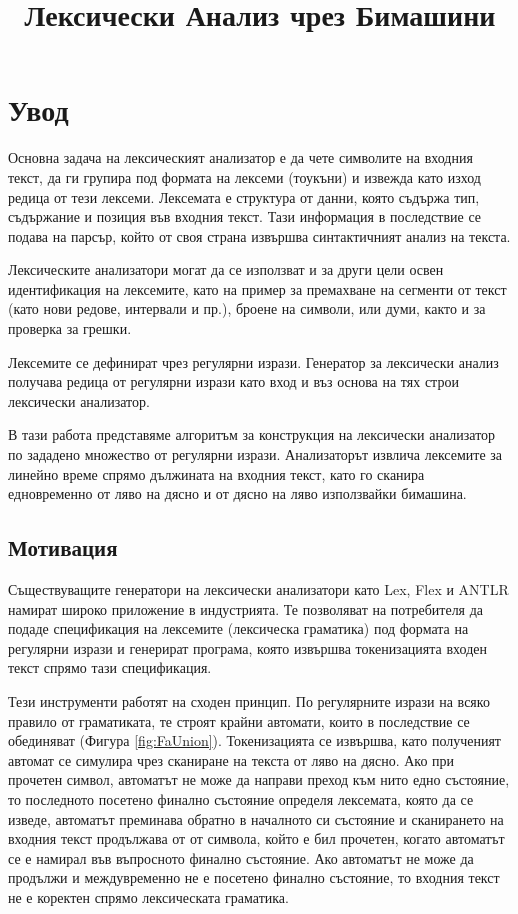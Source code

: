 \documentclass[12pt, oneside]{article}
\title{Лексически Анализ чрез Бимашини}
\theoremstyle{definition}
\begin{document}
\tableofcontents

\pagebreak
\section{Увод}

Основна задача на лексическият анализатор е да чете символите на входния текст, да ги групира под формата на лексеми (тоукъни) и извежда като изход редица от тези лексеми. Лексемата е структура от данни, която съдържа тип, съдържание и позиция във входния текст. Тази информация в последствие се подава на парсър, който от своя страна извършва синтактичният анализ на текста.

Лексическите анализатори могат да се използват и за други цели освен идентификация на лексемите, като на пример за премахване на сегменти от текст (като нови редове, интервали и пр.), броене на символи, или думи, както и за проверка за грешки.

Лексемите се дефинират чрез регулярни изрази. Генератор за лексически анализ получава редица от регулярни изрази като вход и въз основа на тях строи лексически анализатор.

В тази работа представяме алгоритъм за конструкция на лексически анализатор по зададено множество от регулярни изрази. Анализаторът извлича лексемите за линейно време спрямо дължината на входния текст, като го сканира едновременно от ляво на дясно и от дясно на ляво използвайки бимашина.


\subsection{Мотивация}

Съществуващите генератори на лексически анализатори като Lex, Flex и ANTLR намират широко приложение в индустрията. Те позволяват на потребителя да подаде спецификация на лексемите (лексическа граматика) под формата на регулярни изрази и генерират програма, която извършва токенизацията входен текст спрямо тази спецификация.

Тези инструменти работят на сходен принцип. По регулярните изрази на всяко правило от граматиката, те строят крайни автомати, които в последствие се обединяват (Фигура \ref{fig:FaUnion}). Токенизацията се извършва, като полученият автомат се симулира чрез сканиране на текста от ляво на дясно. 
Ако при прочетен символ, автоматът не може да направи преход към нито едно състояние, то последното посетено финално състояние определя лексемата, която да се изведе, автоматът преминава обратно в началното си състояние и сканирането на входния текст продължава от от символа, който е бил прочетен, когато автоматът се е намирал във въпросното финално състояние. Ако автоматът не може да продължи и междувременно не е посетено финално състояние, то входния текст не е коректен спрямо лексическата граматика.
\end{document}
